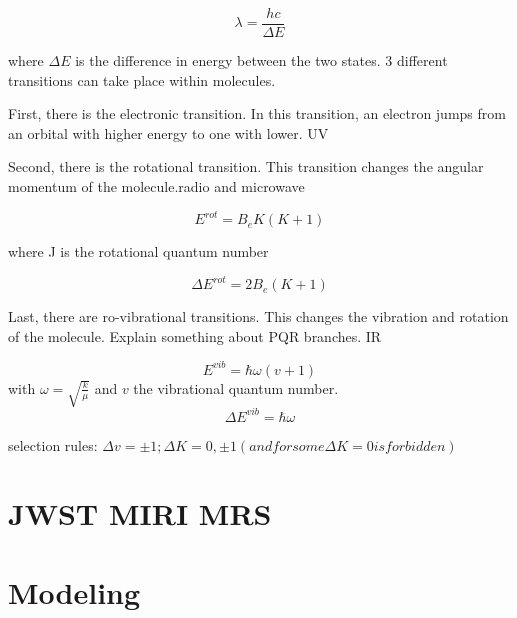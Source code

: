 \documentclass[oneside, single, authoryear, semicolon]{lion-msc}
\newcommand{\4}{$_4$}
\newcommand{\3}{$_3$}
\newcommand{\2}{$_2$}
\begin{document}
\begin{equation}
    \lambda=\frac{hc}{\Delta E}
\end{equation}

where $\Delta E$ is the difference in energy between the two states. 3 different transitions can take place within molecules. 

First, there is the electronic transition. In this transition, an electron jumps from an orbital with higher energy to one with lower. UV 

Second, there is the rotational transition. This transition changes the angular momentum of the molecule.radio and microwave

\begin{equation}
    E^{rot}=B_eK(K+1)
\end{equation}

where J is the rotational quantum number

\begin{equation}
    \Delta  E^{rot}=2B_e(K+1)
\end{equation}

Last, there are ro-vibrational transitions. This changes the vibration and rotation of the molecule. Explain something about PQR branches. IR

\begin{equation}
    E^{vib}=\hbar\omega(v+1)
\end{equation}
with $\omega=\sqrt{\frac{k}{\mu}}$ and $v$ the vibrational quantum number.
\begin{equation}
    \Delta E^{vib}=\hbar\omega
\end{equation}

selection rules:
$\Delta v=\pm 1; \Delta K = 0, \pm1 (and for some \Delta K=0 is forbidden)$

\section{JWST MIRI MRS}


\section{Modeling}
\end{document}
